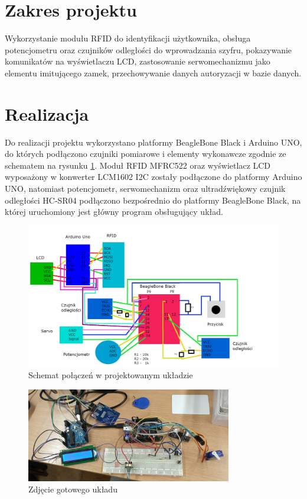 \documentclass[polish,polish,a4paper]{article}
\begin{document}
	
	
	
	\section{Zakres projektu}
	Wykorzystanie modułu RFID do identyfikacji użytkownika, obsługa potencjometru oraz czujników odległości do wprowadzania szyfru, pokazywanie komunikatów na wyświetlaczu LCD, zastosowanie serwomechanizmu jako elementu imitującego zamek, przechowywanie danych autoryzacji w bazie danych.
	
	\section{Realizacja}
	Do realizacji projektu wykorzystano platformy BeagleBone Black i Arduino UNO, do których podłączono czujniki pomiarowe i elementy wykonawcze zgodnie ze schematem na rysunku \ref{schematic}. Moduł RFID MFRC522 oraz wyświetlacz LCD wyposażony w konwerter LCM1602 I2C zostały podłączone do platformy Arduino UNO, natomiast potencjometr, serwomechanizm oraz ultradźwiękowy czujnik odległości HC-SR04 podłączono bezpośrednio do platformy BeagleBone Black, na której uruchomiony jest główny program obsługujący układ.
	\begin{figure}[!h]
		\centering
		\includegraphics[width=\textwidth]{schemat.png}
		\caption{Schemat połączeń w projektowanym układzie}
		\label{schematic}
	\end{figure}
	\begin{figure}[!h]
		\centering
		\includegraphics[width=0.8\textwidth]{uklad.jpg}
		\caption{Zdjęcie gotowego układu}
	\end{figure}
\end{document}
